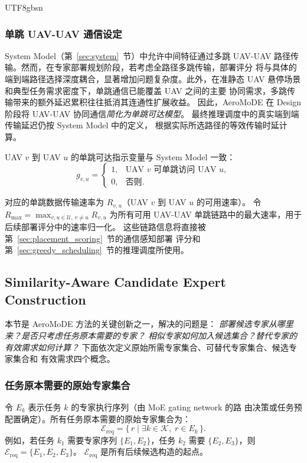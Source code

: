\documentclass[conference]{IEEEtran}
\begin{document}
\begin{CJK*}{UTF8}{gbsn}
\subsubsection{单跳 UAV-UAV 通信设定}

System Model（第~\ref{sec:system}~节）中允许中间特征通过多跳 UAV-UAV
路径传输。然而，在专家部署规划阶段，若考虑全路径多跳传输，部署评分
将与具体的端到端路径选择深度耦合，显著增加问题复杂度。此外，在准静态
UAV 悬停场景和典型任务需求密度下，单跳通信已能覆盖 UAV 之间的主要
协同需求，多跳传输带来的额外延迟累积往往抵消其连通性扩展收益。
因此，AeroMoDE 在 Design 阶段将 UAV-UAV 协同通信\emph{简化为单跳可达模型}。
最终推理调度中的真实端到端传输延迟仍按 System Model 中的定义，
根据实际所选路径的等效传输时延计算。

UAV $v$ 到 UAV $u$ 的单跳可达指示变量与 System Model 一致：
\begin{equation}
g_{v,u} =
\begin{cases}
1, & \text{UAV } v \text{ 可单跳访问 UAV } u,\\
0, & \text{否则}.
\end{cases}
\label{eq:single_hop_g}
\end{equation}

对应的单跳数据传输速率为 $R_{v,u}$（UAV $v$ 到 UAV $u$ 的可用速率）。
令 $R_{\max} = \max_{v,u\in\mathcal{U},\,v\neq u} R_{v,u}$ 为所有可用
UAV-UAV 单跳链路中的最大速率，用于后续部署评分中的速率归一化。
这些链路信息将直接被第~\ref{sec:placement_scoring}~节的通信感知部署
评分和第~\ref{sec:greedy_scheduling}~节的推理调度所使用。

\subsection{Similarity-Aware Candidate Expert Construction}
\label{sec:similarity_candidate}

本节是 AeroMoDE 方法的关键创新之一，解决的问题是：
\emph{部署候选专家从哪里来？是否只考虑任务原本需要的专家？
相似专家如何加入候选集合？替代专家的有效需求如何计算？}
下面依次定义原始所需专家集合、可替代专家集合、候选专家集合和
有效需求四个概念。

\subsubsection{任务原本需要的原始专家集合}

令 $E_k$ 表示任务 $k$ 的专家执行序列（由 MoE gating network 的路
由决策或任务预配置确定）。所有任务原本需要的原始专家集合为：
\begin{equation}
\mathcal{E}_{\mathrm{req}} = \{\,r \mid \exists k\in\mathcal{K},\;
r \in E_k\,\}.
\label{eq:ereq}
\end{equation}
例如，若任务 $k_1$ 需要专家序列 $\{E_1, E_2\}$，任务 $k_2$ 需要
$\{E_2, E_3\}$，则 $\mathcal{E}_{\mathrm{req}} = \{E_1, E_2, E_3\}$。
$\mathcal{E}_{\mathrm{req}}$ 是所有后续候选构造的起点。


\end{CJK*}
\end{document}
